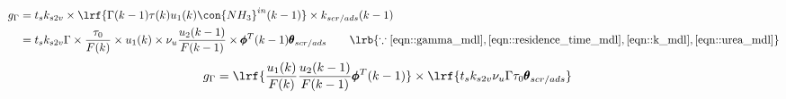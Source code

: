 \begin{align*}
        g_\Gamma &= t_s k_{s2v} \times \lrf{\Gamma(k-1) \tau(k) u_1(k) \con{NH_3}^{in}(k-1)} \times k_{scr/ads}(k-1)\\
                &= t_s k_{s2v} \Gamma \times \frac{\tau_0}{F(k)} \times u_1 (k) \times \nu_u \frac{u_2(k-1)}{F(k-1)}\times \pmb \phi^T(k-1) \pmb \theta_{scr/ads}
                \qquad \lrb{\because \ref{eqn::gamma_mdl}, \ref{eqn::residence_time_mdl}, \ref{eqn::k_mdl}, \ref{eqn::urea_mdl}}
\end{align*}
\begin{align}
        g_\Gamma &= \lrf{ \frac{u_1(k)}{F(k)} \frac{u_2(k-1)}{F(k-1)} \pmb \phi^T(k-1) } \times \lrf{ t_s k_{s2v} \nu_u \Gamma \tau_0 \pmb \theta_{scr/ads} }
\end{align}
